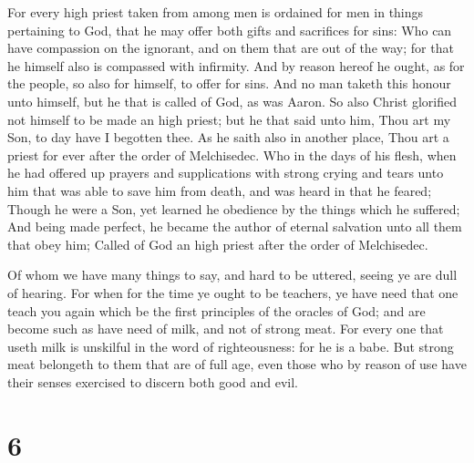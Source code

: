  For every high priest taken from among men is ordained for
men in things pertaining to God, that he may offer both gifts and
sacrifices for sins:  Who can have compassion on the
ignorant, and on them that are out of the way; for that he himself also
is compassed with infirmity.  And by reason hereof he ought,
as for the people, so also for himself, to offer for sins. 
And no man taketh this honour unto himself, but he that is called of
God, as was Aaron.  So also Christ glorified not himself to
be made an high priest; but he that said unto him, Thou art my Son, to
day have I begotten thee.  As he saith also in another
place, Thou art a priest for ever after the order of Melchisedec.
 Who in the days of his flesh, when he had offered up
prayers and supplications with strong crying and tears unto him that was
able to save him from death, and was heard in that he feared;
 Though he were a Son, yet learned he obedience by the
things which he suffered;  And being made perfect, he became
the author of eternal salvation unto all them that obey him;
 Called of God an high priest after the order of
Melchisedec.

 Of whom we have many things to say, and hard to be
uttered, seeing ye are dull of hearing.  For when for the
time ye ought to be teachers, ye have need that one teach you again
which be the first principles of the oracles of God; and are become such
as have need of milk, and not of strong meat.  For every
one that useth milk is unskilful in the word of righteousness: for he is
a babe.  But strong meat belongeth to them that are of full
age, even those who by reason of use have their senses exercised to
discern both good and evil.

\hypertarget{section-5}{%
\section{6}\label{section-5}}

